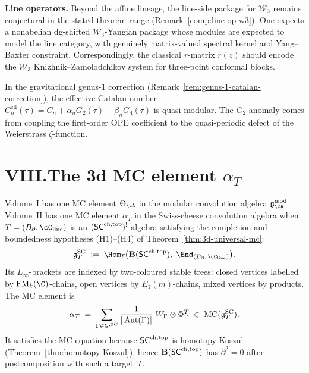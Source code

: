 \smallskip
\noindent\textbf{Line operators.}\enspace
Beyond the affine lineage, the line-side package for
$\mathcal{W}_3$ remains conjectural in the stated theorem range
\textup{(}Remark~\textup{\ref{comp:line-op-w3}}\textup{)}. One
expects a nonabelian dg-shifted $\mathcal{W}_3$-Yangian package
whose modules are expected to model the line category, with genuinely matrix-valued spectral
kernel and Yang--Baxter constraint. Correspondingly, the
classical $r$-matrix $r(z)$ should encode the $\mathcal{W}_3$
Knizhnik--Zamolodchikov system for three-point conformal blocks.

In the gravitational genus-$1$ correction
\textup{(}Remark~\ref{rem:genus-1-catalan-correction}\textup{)}, the
effective Catalan number
$C_n^{\mathrm{eff}}(\tau)=C_n+\alpha_nG_2(\tau)+\beta_nG_4(\tau)$ is
quasi-modular. The $G_2$ anomaly comes from coupling the first-order
OPE coefficient to the quasi-periodic defect of the Weierstrass
$\zeta$-function.


\section*{VIII.\quad The 3d MC element $\alpha_T$}

Volume~I has one MC element $\Theta_\cA$ in the modular
convolution algebra $\gAmod$. Volume~II has one MC element
$\alpha_T$ in the Swiss-cheese convolution algebra
when $T=(\Bbound,\cC_{\mathrm{line}})$ is an
$(\mathsf{SC}^{\mathrm{ch,top}})^!$-algebra satisfying the completion and boundedness
hypotheses (H1)--(H4) of Theorem~\ref{thm:3d-universal-mc}:
\[
\gSC_T
\;:=\;
\Hom_\Sigma\!\bigl(
 \mathbf{B}(\SCchtop),\;
 \End_{(\Bbound,\,\cC_{\mathrm{line}})}
\bigr).
\]
Its $L_\infty$-brackets are indexed by two-coloured stable trees:
closed vertices labelled by $\FM_k(\C)$-chains, open vertices by
$E_1(m)$-chains, mixed vertices by products. The MC element is
\[
\alpha_T
\;=\;
\sum_{\Gamma \in \mathsf{Gr}^{\mathrm{SC}}}
\frac{1}{|\operatorname{Aut}(\Gamma)|}
\;W_\Gamma \otimes \Phi_\Gamma^T
\;\in\;
\operatorname{MC}(\mathfrak{g}^{\mathrm{SC}}_T).
\]
It satisfies the MC equation because $\mathsf{SC}^{\mathrm{ch,top}}$ is homotopy-Koszul
(Theorem~\ref{thm:homotopy-Koszul}), hence
$\mathbf{B}(\mathsf{SC}^{\mathrm{ch,top}})$ has $\partial^2 = 0$ after postcomposition
with such a target~$T$.

